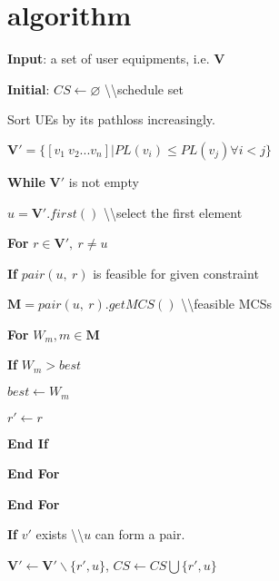 \section{algorithm}

\begin{algorithm}[t]
\setcounter{lines}{0}

\algline \textbf{Input}: a set of user equipments, i.e. $\mathbf{V}$

\algline \textbf{Initial}: $CS \leftarrow \varnothing$ \textbackslash\textbackslash schedule set

\algline Sort UEs by its pathloss increasingly.

\textbf{\quad{}\quad{}}$\mathbf{V'} = \{[v_1\medspace v_2 ... v_n] | PL(v_i) \leq PL(v_j) \forall i < j\}$

\algline \textbf{While } $\mathbf{V'}$ is not empty

\algline \textbf{\quad{}} $u = \mathbf{V'}.first()$ \textbackslash\textbackslash select the first element

\algline \textbf{\quad{}For } $r \in \mathbf{V'},\medspace r\neq u$

\algline \textbf{\quad{}}\textbf{\quad{}If } $pair(u,\medspace r)$ is feasible for given constraint

\algline \textbf{\quad{}}\textbf{\quad{}}\textbf{\quad{}} $\mathbf{M} =pair(u,\medspace r).getMCS()$ \textbackslash\textbackslash feasible MCSs

\algline \textbf{\quad{}}\textbf{\quad{}}\textbf{\quad{}For } $W_{m}, m\in \textbf{M}$

\algline \textbf{\quad{}}\textbf{\quad{}}\textbf{\quad{}}\textbf{\quad{}If } $W_{m} > best$

\algline \textbf{\quad{}}\textbf{\quad{}}\textbf{\quad{}}\textbf{\quad{}}\textbf{\quad{}} $best \leftarrow W_{m}$

\algline \textbf{\quad{}}\textbf{\quad{}}\textbf{\quad{}}\textbf{\quad{}}\textbf{\quad{}} $r' \leftarrow r$

\algline \textbf{\quad{}}\textbf{\quad{}}\textbf{\quad{}}\textbf{\quad{}End If}

\algline \textbf{\quad{}}\textbf{\quad{}}\textbf{\quad{}End For}

\algline \textbf{\quad{}}\textbf{\quad{}End For}

\algline \textbf{\quad{}}\textbf{\quad{}If } $v'$ exists \textbackslash\textbackslash $u$ can form a pair.

\algline \textbf{\quad{}}\textbf{\quad{}}\textbf{\quad{}} $\mathbf{V'}\leftarrow \mathbf{V'}\backslash \{r', u\}$, $CS \leftarrow CS \bigcup \{r', u\}$


\end{algorithm}
